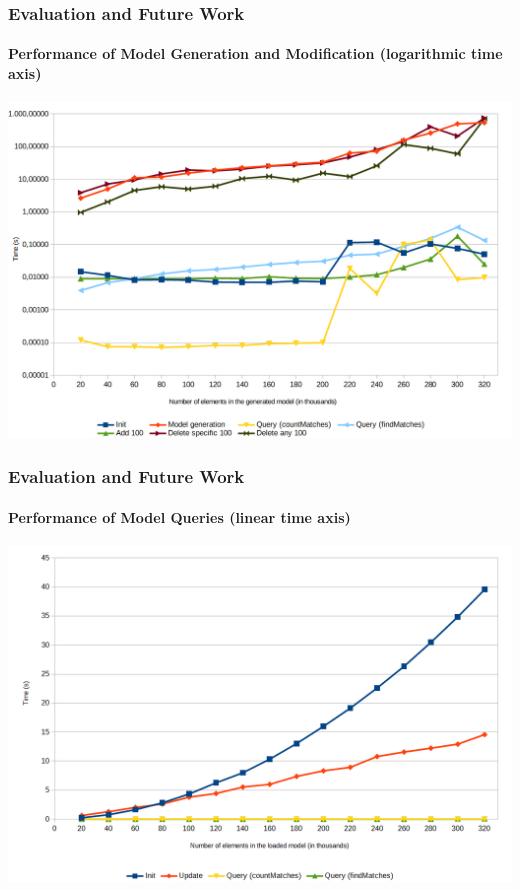 	\begin{frame}
		\frametitle{Evaluation and Future Work}
		\framesubtitle{Performance of Model Generation and Modification (logarithmic time axis)}
		\begin{center}
			\includegraphics[height=.75\textheight]{../common/figures/evaluation-runtime1-logarithmic}
		\end{center}
	\end{frame}
	\begin{frame}
		\frametitle{Evaluation and Future Work}
		\framesubtitle{Performance of Model Queries (linear time axis)}
		\begin{center}
			\includegraphics[height=.75\textheight]{../common/figures/evaluation-runtime2}
		\end{center}
	\end{frame}
